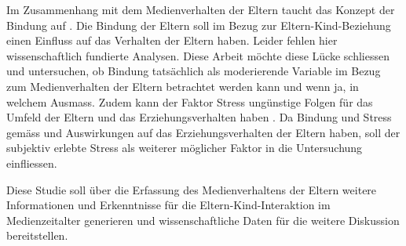 Im Zusammenhang mit dem Medienverhalten der Eltern taucht das Konzept der Bindung auf \cite{Prekop2017, Weber2017, Blikk2017}. Die Bindung der Eltern soll im Bezug zur Eltern-Kind-Beziehung einen Einfluss auf das Verhalten der Eltern haben. Leider fehlen hier wissenschaftlich fundierte Analysen. Diese Arbeit möchte diese Lücke schliessen und untersuchen, ob Bindung tatsächlich als moderierende Variable im Bezug zum Medienverhalten der Eltern betrachtet werden kann und wenn ja, in welchem Ausmass. Zudem kann der Faktor Stress ungünstige Folgen für das Umfeld der Eltern und das Erziehungsverhalten haben \cite{Cina2009}. Da Bindung und Stress gemäss  und  Auswirkungen auf das Erziehungsverhalten der Eltern haben, soll der subjektiv erlebte Stress als weiterer möglicher Faktor in die Untersuchung einfliessen.  

Diese Studie soll über die Erfassung des Medienverhaltens der Eltern weitere Informationen und Erkenntnisse für die Eltern-Kind-Interaktion im Medienzeitalter generieren und wissenschaftliche Daten für die weitere Diskussion bereitstellen.





